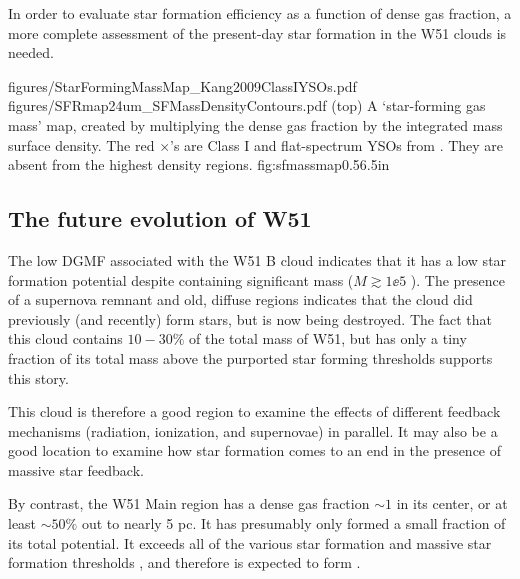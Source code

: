 In order to evaluate star formation efficiency as a
function of dense gas fraction, a more complete assessment of the present-day
 star formation in the W51 clouds is needed.

\FigureTwoAA
{figures/StarFormingMassMap_Kang2009ClassIYSOs.pdf}
{figures/SFRmap24um_SFMassDensityContours.pdf}
{(top) A `star-forming gas mass' map, created by multiplying the dense gas
fraction by the integrated \thirteenco mass surface density.  The red
$\times$'s are Class I and flat-spectrum YSOs from \citet{Kang2009a}.  They are
absent from the highest density regions.
}
{fig:sfmassmap}{0.5}{6.5in}

\subsection{The future evolution of W51}
\label{sec:futureev}
The low DGMF associated with the W51 B cloud indicates that it has a
low star formation potential despite containing significant mass
($M\gtrsim1\ee{5}$ \msun).  The presence of a supernova remnant and old,
diffuse \hii regions indicates that the cloud did previously (and recently) form
stars, but is now being destroyed.  The fact that this cloud contains $10-30\%$
of the total mass of W51, but has only a tiny fraction of its total mass above
the purported star forming thresholds supports this story.

This cloud is therefore a good region to examine the effects of different
feedback mechanisms (radiation, ionization, and supernovae) in parallel.  It
may also be a good location to examine how star formation comes to an end in
the presence of massive star feedback.

By contrast, the W51 Main region has a dense gas fraction $\sim1$ in its
center, or at least $\sim50\%$ out to nearly 5 pc.  It has presumably only
formed a small fraction
of its total potential.  It exceeds all of the various star formation and
massive star formation thresholds
\citep[e.g.][]{Lada2010a,Krumholz2008a,Kauffmann2010a}, and therefore is
expected to form .


